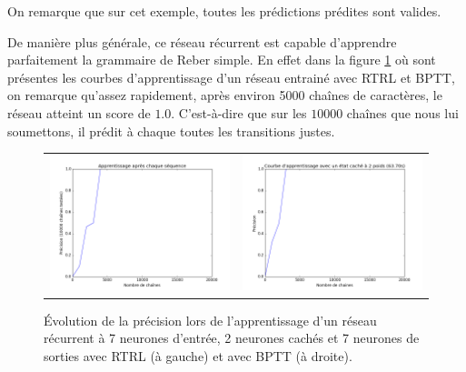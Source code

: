 On remarque que sur cet exemple, toutes les prédictions prédites sont valides.

De manière plus générale, ce réseau récurrent est capable d'apprendre parfaitement la grammaire de Reber simple. En effet dans la figure \ref{curves_reber_simple} où sont présentes les courbes d'apprentissage d'un réseau entrainé avec RTRL et BPTT, on remarque qu'assez rapidement, après environ 5000 chaînes de caractères, le réseau atteint un score de $1.0$. C'est-à-dire que sur les $10000$ chaînes que nous lui soumettons, il prédit à chaque toutes les transitions justes.

\begin{figure}[h!]
\begin{center}
\begin{tabular}{cc}
\includegraphics[scale=0.3]{images/chapter5/learning_curve_rtrl_reber_sequence.png} & 
\includegraphics[scale=0.3]{images/chapter5/learning_curve_bptt_reber_sequence.png}
\end{tabular}
\caption{Évolution de la précision lors de l'apprentissage d'un réseau récurrent à 7 neurones d'entrée, 2 neurones cachés et 7 neurones de sorties avec RTRL (à gauche) et avec BPTT (à droite).}
\label{curves_reber_simple}
\end{center}
\end{figure}

